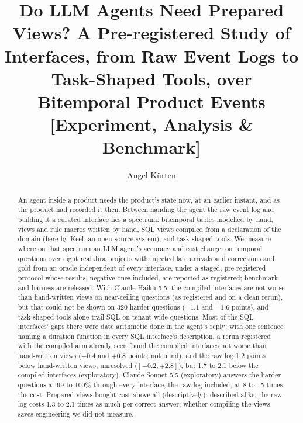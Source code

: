 \documentclass[sigconf, nonacm]{acmart}
\begin{document}
\title{Do LLM Agents Need Prepared Views? A Pre-registered Study of Interfaces, from Raw Event Logs to Task-Shaped Tools, over Bitemporal Product Events [Experiment, Analysis \& Benchmark]}

\author{Angel K\"urten}

\begin{abstract}
An agent inside a product needs the product's state now, at an earlier instant, and as the product had recorded it then. Between handing the agent the raw event log and building it a curated interface lies a spectrum: bitemporal tables modelled by hand, views and rule macros written by hand, SQL views compiled from a declaration of the domain (here by Keel, an open-source system), and task-shaped tools. We measure where on that spectrum an LLM agent's accuracy and cost change, on temporal questions over eight real Jira projects with injected late arrivals and corrections and gold from an oracle independent of every interface, under a staged, pre-registered protocol whose results, negative ones included, are reported as registered; benchmark and harness are released. With Claude Haiku 5.5, the compiled interfaces are not worse than hand-written views on near-ceiling questions (as registered and on a clean rerun), but that could not be shown on 320 harder questions ($-1.1$ and $-1.6$ points), and task-shaped tools alone trail SQL on tenant-wide questions. Most of the SQL interfaces' gaps there were date arithmetic done in the agent's reply: with one sentence naming a duration function in every SQL interface's description, a rerun registered with the compiled arm already seen found the compiled interfaces not worse than hand-written views ($+0.4$ and $+0.8$ points; not blind), and the raw log 1.2 points below hand-written views, unresolved ($[-0.2, +2.8]$), but 1.7 to 2.1 below the compiled interfaces (exploratory). Claude Sonnet 5.5 (exploratory) answers the harder questions at 99 to 100\% through every interface, the raw log included, at 8 to 15 times the cost. Prepared views bought cost above all (descriptively): described alike, the raw log costs 1.3 to 2.1 times as much per correct answer; whether compiling the views saves engineering we did not measure.
\end{abstract}

\maketitle
\end{document}

